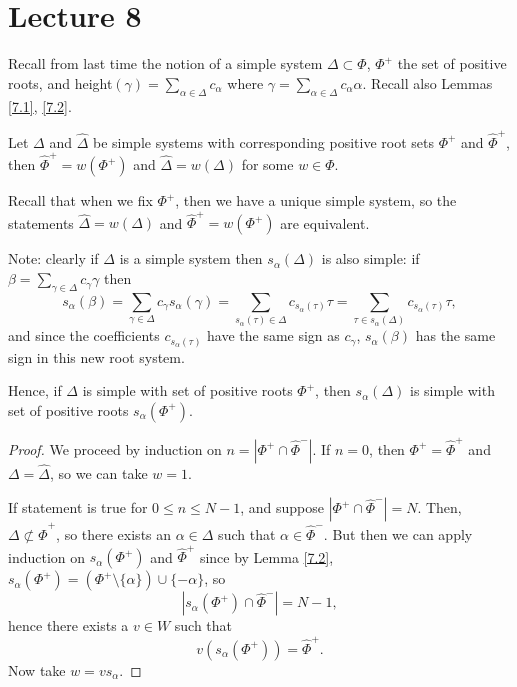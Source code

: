 \section{Lecture 8}

Recall from last time the notion of a simple system $\Delta \subset \Phi$,
$\Phi^+$ the set of positive roots, and height$(\gamma) = \sum_{\alpha \in \Delta}
c_\alpha$ where $\gamma = \sum_{\alpha \in \Delta} c_\alpha \alpha$. Recall also
Lemmas \ref{7.1}, \ref{7.2}.

\begin{lemma} \label{8.1}
Let $\Delta$ and $\hat{\Delta}$ be simple systems with corresponding positive
root sets $\Phi^+$ and $\hat{\Phi}^+$, then $\hat{\Phi}^+ = w(\Phi^+)$ and
$\hat{\Delta} = w(\Delta)$ for some $w \in \Phi$.
\end{lemma}

Recall that when we fix $\Phi^+$, then we have a unique simple system, so the
statements $\hat{\Delta} = w(\Delta)$ and $\hat{\Phi}^+ = w(\Phi^+)$ are
equivalent.

Note: clearly if $\Delta$ is a simple system then $s_\alpha(\Delta)$ is also
simple: if $\beta = \sum_{\gamma \in \Delta} c_\gamma \gamma$ then
\[
    s_\alpha(\beta) = \sum_{\gamma \in \Delta} c_\gamma s_\alpha(\gamma)
    = \sum_{s_\alpha(\tau) \in \Delta} c_{s_\alpha(\tau)} \tau
    = \sum_{\tau \in s_\alpha(\Delta)} c_{s_\alpha(\tau)} \tau,
\]
and since the coefficients $c_{s_\alpha(\tau)}$ have the same sign as $c_\gamma$,
$s_\alpha(\beta)$ has the same sign in this new root system.

Hence, if $\Delta$ is simple with set of positive roots $\Phi^+$, then
$s_\alpha(\Delta)$ is simple with set of positive roots $s_\alpha(\Phi^+)$.

\begin{proof}
We proceed by induction on $n = |\Phi^+ \cap \hat{\Phi}^-|$.
If $n = 0$, then $\Phi^+ = \hat{\Phi}^+$ and $\Delta = \hat{\Delta}$, so we can
take $w = 1$.

If statement is true for $0 \leq n \leq N-1$, and suppose
$|\Phi^+ \cap \hat{\Phi}^-| = N$. Then, $\Delta \not\subset \hat{\Phi}^+$, so
there exists an $\alpha \in \Delta$ such that $\alpha \in \hat{\Phi}^-$. But
then we can apply induction on $s_\alpha(\Phi^+)$ and $\hat{\Phi}^+$ since by
Lemma \ref{7.2}, $s_\alpha(\Phi^+) = (\Phi^+ \setminus \{\alpha\}) \cup \{-\alpha\}$,
so
\[
    \left| s_\alpha(\Phi^+) \cap \hat{\Phi}^- \right| = N-1,
\]
hence there exists a $v \in W$ such that
\[
    v(s_\alpha(\Phi^+)) = \hat{\Phi}^+.
\]
Now take $w = vs_\alpha$.
\end{proof}


